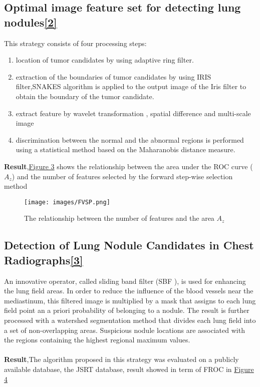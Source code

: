\documentclass[hidelinks,12pt]{article}
\begin{document}
\subsection{Optimal image feature set for detecting lung nodules\hyperref[2]{[2]}}
This strategy consists of four processing steps:\\
\begin{enumerate}
\item location of tumor candidates by using adaptive ring filter.
\item extraction of the boundaries of tumor candidates by using IRIS filter,SNAKES algorithm is applied to the output
image of the Iris filter to obtain the boundary of the tumor candidate.
\item extract feature by wavelet transformation , spatial difference and multi-scale image
\item discrimination between the normal and the abnormal regions is performed
using a statistical method based on the Maharanobis distance measure.
\end{enumerate}
\textbf{Result},\hyperref[fig:2]{Figure 3} shows the relationship between the area under the ROC curve ($A_z$) and the number of features selected by the forward step-wise selection method \\
	\begin{figure}[h]
      \texttt{[image: images/FVSP.png]}
      \centering
      \label{fig:2}
      \caption{The relationship between the number of features
      and the area $A_z$}
	\end{figure}

\newpage

\subsection{Detection of Lung Nodule Candidates in Chest Radiographs\hyperref[3]{[3]}}

An innovative operator, called sliding band filter (SBF ), is used for enhancing the lung field areas. In order to reduce the influence of the blood vessels near the mediastinum, this filtered image is multiplied by a mask that assigns to each lung field point an a priori probability of belonging to a nodule. The result is further processed with a watershed segmentation method that divides each lung field into a set of non-overlapping areas. Suspicious nodule locations are associated with the regions containing the highest regional maximum values.\\ \\
\textbf{Result},The algorithm proposed in this strategy was evaluated on a publicly available database, the JSRT database, result showed in term of FROC in \hyperref[fig:3]{Figure 4}
\end{document}
